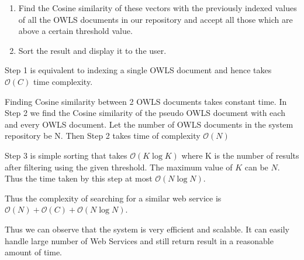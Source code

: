 \documentclass[12pt, twoside]{book}
\begin{document}
\begin{itemize}
\begin{enumerate}
  \item Find the Cosine similarity of these vectors with the previously indexed values of all the OWLS documents in our repository and accept all those which are above a certain threshold value.
  \item Sort the result and display it to the user.
 \end{enumerate}
 Step 1 is equivalent to indexing a single OWLS document and hence takes $\mathcal{O}(C)$ time complexity. \\ \par
 Finding Cosine similarity between 2 OWLS documents takes constant time. In Step 2 we find the Cosine similarity of the pseudo OWLS document with each and every OWLS document. Let the number of OWLS documents in the system repository be N. Then Step 2 takes time of complexity $\mathcal{O}(N)$ \\ \par
 Step 3 is simple sorting that takes $\mathcal{O}(K\log{K})$ where K is the number of results after filtering using the given threshold. The maximum value of $K$ can be $N$. Thus the time taken by this step at most $\mathcal{O}(N\log{N})$. \\ \par
 Thus the complexity of searching for a similar web service is $\mathcal{O}(N) + \mathcal{O}(C) + \mathcal{O}(N\log{N})$.
\end{itemize}
Thus we can observe that the system is very efficient and scalable. It can easily handle large number of Web Services and still return result in a reasonable amount of time.
\end{document}
